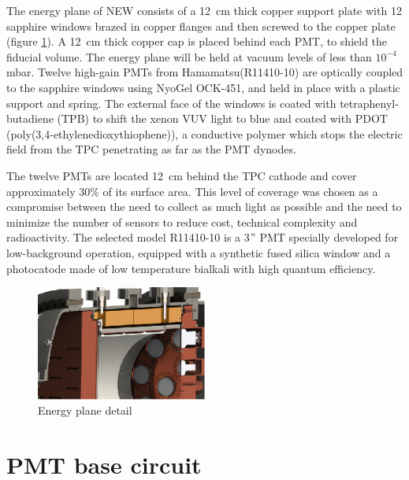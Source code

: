 \documentclass[a4paper, 10pt, oneside, twocolumn, 3p]{elsarticle}
\begin{document}
\par The energy plane of NEW consists of a 12~cm thick copper support plate with 12 sapphire windows brazed in copper flanges and then screwed to the copper plate (figure \ref{fig:detail}). A 12~cm thick copper cap is placed behind each PMT, to shield the fiducial volume. The energy plane will be held at vacuum levels of less than $10^{-4}$ mbar. Twelve \mbox{high-gain} PMTs from Hamamatsu(R11410-10) \cite{PMT} are optically coupled to the sapphire windows using NyoGel OCK-451, and held in place with a plastic support and spring. The external face of the windows is coated with tetraphenyl-butadiene (TPB) to shift the xenon VUV light to blue and coated with PDOT (poly(3,4-ethylenedioxythiophene)), a conductive polymer which stops the electric field from the TPC penetrating as far as the PMT dynodes. 

\par The twelve PMTs are located 12~cm behind the TPC cathode and cover approximately 30\% of its surface area. This level of coverage was chosen as a compromise between the need to collect as much light as possible and the need to minimize the number of sensors to reduce cost, technical complexity and radioactivity.  The selected model R11410-10 is a 3$"$ PMT specially developed for low-background operation, equipped with a synthetic fused silica window and a photocatode made of low temperature bialkali with high quantum efficiency. 


\begin{figure}
  \begin{center}
   	 \includegraphics[width=0.5\textwidth]{./figures/EP_detalle.png}   
   	 \caption{Energy plane detail}
   	 \label{fig:detail}
  \end{center}
\end{figure}



\section {PMT base circuit}
\end{document}
